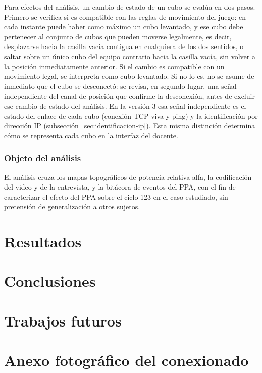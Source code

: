 \documentclass{book}
\begin{document}
Para efectos del análisis, un cambio de estado de un cubo se evalúa en dos pasos. Primero se verifica si es compatible con las reglas de movimiento del juego: en cada instante puede haber como máximo un cubo levantado, y ese cubo debe pertenecer al conjunto de cubos que pueden moverse legalmente, es decir, desplazarse hacia la casilla vacía contigua en cualquiera de los dos sentidos, o saltar sobre un único cubo del equipo contrario hacia la casilla vacía, sin volver a la posición inmediatamente anterior. Si el cambio es compatible con un movimiento legal, se interpreta como cubo levantado. Si no lo es, no se asume de inmediato que el cubo se desconectó: se revisa, en segundo lugar, una señal independiente del canal de posición que confirme la desconexión, antes de excluir ese cambio de estado del análisis. En la versión 3 esa señal independiente es el estado del enlace de cada cubo (conexión TCP viva y ping) y la identificación por dirección IP (subsección~\ref{sec:identificacion-ip}). Esta misma distinción determina cómo se representa cada cubo en la interfaz del docente.

\subsection{Objeto del análisis}

El análisis cruza los mapas topográficos de potencia relativa alfa, la codificación del video y de la entrevista, y la bitácora de eventos del PPA, con el fin de caracterizar el efecto del PPA sobre el ciclo 123 en el caso estudiado, sin pretensión de generalización a otros sujetos.

\chapter{Resultados}
\chapter{Conclusiones}



\chapter{Trabajos futuros}
\chapter{Anexo fotográfico del conexionado}
\label{anexo:conexionado}
\raggedbottom
\end{document}
